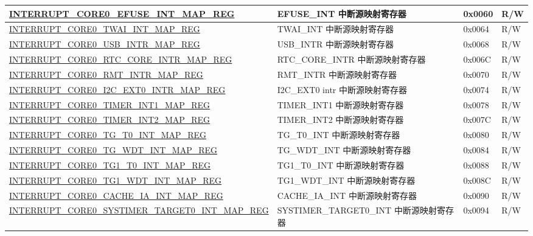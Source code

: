 \begin{longtable}{ | p{10cm} | m{10cm} | m{1.3cm} | m{1.0cm} | }
\hyperref[regdesc:INTERRUPTCORE0EFUSEINTMAPREG]{INTERRUPT\_CORE0\_EFUSE\_INT\_MAP\_REG} & EFUSE\_INT 中断源映射寄存器 & 0x0060 & R/W \\ \hline
\hyperref[regdesc:INTERRUPTCORE0TWAIINTMAPREG]{INTERRUPT\_CORE0\_TWAI\_INT\_MAP\_REG} & TWAI\_INT 中断源映射寄存器 & 0x0064 & R/W \\ \hline
\hyperref[regdesc:INTERRUPTCORE0USBINTRMAPREG]{INTERRUPT\_CORE0\_USB\_INTR\_MAP\_REG} & USB\_INTR 中断源映射寄存器 & 0x0068 & R/W \\ \hline
\hyperref[regdesc:INTERRUPTCORE0RTCCOREINTRMAPREG]{INTERRUPT\_CORE0\_RTC\_CORE\_INTR\_MAP\_REG} & RTC\_CORE\_INTR 中断源映射寄存器 & 0x006C & R/W \\ \hline
\hyperref[regdesc:INTERRUPTCORE0RMTINTRMAPREG]{INTERRUPT\_CORE0\_RMT\_INTR\_MAP\_REG} & RMT\_INTR 中断源映射寄存器 & 0x0070 & R/W \\ \hline
\hyperref[regdesc:INTERRUPTCORE0I2CEXT0INTRMAPREG]{INTERRUPT\_CORE0\_I2C\_EXT0\_INTR\_MAP\_REG} & I2C\_EXT0 intr 中断源映射寄存器 & 0x0074 & R/W \\ \hline
\hyperref[regdesc:INTERRUPTCORE0TIMERINT1MAPREG]{INTERRUPT\_CORE0\_TIMER\_INT1\_MAP\_REG} & TIMER\_INT1 中断源映射寄存器 & 0x0078 & R/W \\ \hline
\hyperref[regdesc:INTERRUPTCORE0TIMERINT2MAPREG]{INTERRUPT\_CORE0\_TIMER\_INT2\_MAP\_REG} & TIMER\_INT2 中断源映射寄存器 & 0x007C & R/W \\ \hline
\hyperref[regdesc:INTERRUPTCORE0TGT0INTMAPREG]{INTERRUPT\_CORE0\_TG\_T0\_INT\_MAP\_REG} & TG\_T0\_INT 中断源映射寄存器 & 0x0080 & R/W \\ \hline
\hyperref[regdesc:INTERRUPTCORE0TGWDTINTMAPREG]{INTERRUPT\_CORE0\_TG\_WDT\_INT\_MAP\_REG} & TG\_WDT\_INT 中断源映射寄存器 & 0x0084 & R/W \\ \hline
\hyperref[regdesc:INTERRUPTCORE0TG1T0INTMAPREG]{INTERRUPT\_CORE0\_TG1\_T0\_INT\_MAP\_REG} & TG1\_T0\_INT 中断源映射寄存器 & 0x0088 & R/W \\ \hline
\hyperref[regdesc:INTERRUPTCORE0TG1WDTINTMAPREG]{INTERRUPT\_CORE0\_TG1\_WDT\_INT\_MAP\_REG} & TG1\_WDT\_INT 中断源映射寄存器 & 0x008C & R/W \\ \hline
\hyperref[regdesc:INTERRUPTCORE0CACHEIAINTMAPREG]{INTERRUPT\_CORE0\_CACHE\_IA\_INT\_MAP\_REG} & CACHE\_IA\_INT 中断源映射寄存器 & 0x0090 & R/W \\ \hline
\hyperref[regdesc:INTERRUPTCORE0SYSTIMERTARGET0INTMAPREG]{INTERRUPT\_CORE0\_SYSTIMER\_TARGET0\_INT\_MAP\_REG} & SYSTIMER\_TARGET0\_INT 中断源映射寄存器 & 0x0094 & R/W \\ \hline

\end{longtable}
